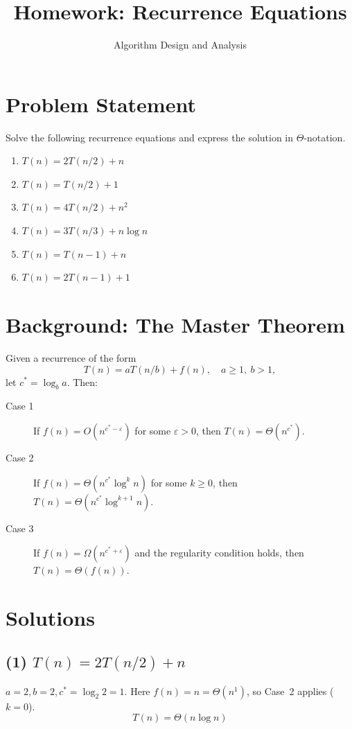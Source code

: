 \documentclass[12pt]{article}
\title{Homework: Recurrence Equations}
\author{Algorithm Design and Analysis}
\date{}
\begin{document}
\maketitle

\section{Problem Statement}

Solve the following recurrence equations and express the solution in $\Theta$-notation.

\begin{enumerate}
  \item $T(n) = 2T(n/2) + n$
  \item $T(n) = T(n/2) + 1$
  \item $T(n) = 4T(n/2) + n^2$
  \item $T(n) = 3T(n/3) + n \log n$
  \item $T(n) = T(n-1) + n$
  \item $T(n) = 2T(n-1) + 1$
\end{enumerate}

\section{Background: The Master Theorem}

Given a recurrence of the form
\[
  T(n) = aT(n/b) + f(n), \quad a \geq 1,\ b > 1,
\]
let $c^* = \log_b a$. Then:

\begin{description}
  \item[Case 1] If $f(n) = O(n^{c^*-\varepsilon})$ for some $\varepsilon > 0$, then $T(n) = \Theta(n^{c^*})$.
  \item[Case 2] If $f(n) = \Theta(n^{c^*} \log^k n)$ for some $k \geq 0$, then $T(n) = \Theta(n^{c^*} \log^{k+1} n)$.
  \item[Case 3] If $f(n) = \Omega(n^{c^*+\varepsilon})$ and the regularity condition holds, then $T(n) = \Theta(f(n))$.
\end{description}

\section{Solutions}

\subsection*{(1) $T(n) = 2T(n/2) + n$}
$a=2, b=2, c^*=\log_2 2=1$. Here $f(n)=n=\Theta(n^1)$, so Case~2 applies ($k=0$).
\[
  \boxed{T(n) = \Theta(n \log n)}
\]
\end{document}
